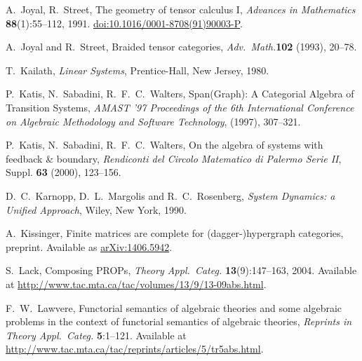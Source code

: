 \begin{thebibliography}{RSW00}
     A.\ Joyal, R.\ Street, The geometry of tensor calculus I,
    \emph{Advances in Mathematics} {\bf 88}(1):55--112, 1991.
    \href{http://doi.org/10.1016/0001-8708(91)90003-P}{doi:10.1016/0001-8708(91)90003-P}.

     A.\ Joyal and R.\ Street, Braided tensor categories, {\sl Adv.\ 
    Math.}{\bf 102} (1993), 20--78.


     T.\ Kailath, \emph{Linear Systems}, Prentice-Hall, New Jersey, 1980.

     P.\ Katis, N.\ Sabadini, R.\ F.\ C.\
    Walters, Span(Graph): A Categorial Algebra of Transition Systems, {\sl
      AMAST '97 Proceedings of the 6th International Conference on Algebraic
    Methodology and Software Technology}, (1997), 307--321. 

     P.\ Katis, N.\ Sabadini, R.\ F.\
    C.\ Walters, On the algebra of systems with feedback \& boundary, {\sl
    Rendiconti del Circolo Matematico di Palermo Serie II}, Suppl. {\bf 63}
    (2000), 123--156.



    \bibitem{KRM} D.\ C.\ Karnopp, D.\ L.\ Margolis and R.\ C.\ Rosenberg, 	
    \textsl{System Dynamics: a Unified Approach}, Wiley, New York, 1990.

    \bibitem[Kissinger 2014]{Ki} A.\ Kissinger, Finite matrices are complete for
    (dagger-)hypergraph categories, preprint. Available as
    \href{http://arxiv.org/abs/1406.5942}{arXiv:1406.5942}.

    \bibitem[La04]{La} S.\ Lack, Composing PROPs, \textsl{Theory Appl.\ Categ.} {\bf
    13}(9):147--163, 2004. Available at
    \href{http://www.tac.mta.ca/tac/volumes/13/9/13-09abs.html}
    {http://www.tac.mta.ca/tac/volumes/13/9/13-09abs.html}.

    \bibitem[La63]{Law} F.\ W.\ Lawvere, Functorial semantics of algebraic theories and
    some algebraic problems in the context of functorial semantics of algebraic
    theories, \textsl{Reprints in Theory Appl.\ Categ.} {\bf 5}:1--121.
    Available at
    \href{http://www.tac.mta.ca/tac/reprints/articles/5/tr5abs.html}
    {http://www.tac.mta.ca/tac/reprints/articles/5/tr5abs.html}.


\end{thebibliography}
